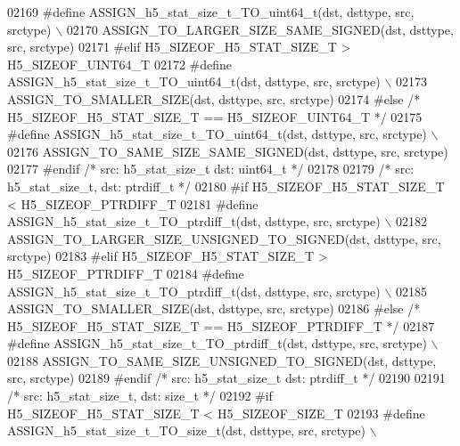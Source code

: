 \begin{DoxyCode}
02169 \textcolor{preprocessor}{    #define ASSIGN\_h5\_stat\_size\_t\_TO\_uint64\_t(dst, dsttype, src, srctype) \(\backslash\)}
02170 \textcolor{preprocessor}{        ASSIGN\_TO\_LARGER\_SIZE\_SAME\_SIGNED(dst, dsttype, src, srctype)}
02171 \textcolor{preprocessor}{#elif H5\_SIZEOF\_H5\_STAT\_SIZE\_T > H5\_SIZEOF\_UINT64\_T}
02172 \textcolor{preprocessor}{    #define ASSIGN\_h5\_stat\_size\_t\_TO\_uint64\_t(dst, dsttype, src, srctype) \(\backslash\)}
02173 \textcolor{preprocessor}{        ASSIGN\_TO\_SMALLER\_SIZE(dst, dsttype, src, srctype)}
02174 \textcolor{preprocessor}{#else }\textcolor{comment}{/* H5\_SIZEOF\_H5\_STAT\_SIZE\_T == H5\_SIZEOF\_UINT64\_T */}\textcolor{preprocessor}{}
02175 \textcolor{preprocessor}{    #define ASSIGN\_h5\_stat\_size\_t\_TO\_uint64\_t(dst, dsttype, src, srctype) \(\backslash\)}
02176 \textcolor{preprocessor}{        ASSIGN\_TO\_SAME\_SIZE\_SAME\_SIGNED(dst, dsttype, src, srctype)}
02177 \textcolor{preprocessor}{#endif }\textcolor{comment}{/* src: h5\_stat\_size\_t dst: uint64\_t */}\textcolor{preprocessor}{}
02178 
02179 \textcolor{comment}{/* src: h5\_stat\_size\_t, dst: ptrdiff\_t */}
02180 \textcolor{preprocessor}{#if H5\_SIZEOF\_H5\_STAT\_SIZE\_T < H5\_SIZEOF\_PTRDIFF\_T}
02181 \textcolor{preprocessor}{    #define ASSIGN\_h5\_stat\_size\_t\_TO\_ptrdiff\_t(dst, dsttype, src, srctype) \(\backslash\)}
02182 \textcolor{preprocessor}{        ASSIGN\_TO\_LARGER\_SIZE\_UNSIGNED\_TO\_SIGNED(dst, dsttype, src, srctype)}
02183 \textcolor{preprocessor}{#elif H5\_SIZEOF\_H5\_STAT\_SIZE\_T > H5\_SIZEOF\_PTRDIFF\_T}
02184 \textcolor{preprocessor}{    #define ASSIGN\_h5\_stat\_size\_t\_TO\_ptrdiff\_t(dst, dsttype, src, srctype) \(\backslash\)}
02185 \textcolor{preprocessor}{        ASSIGN\_TO\_SMALLER\_SIZE(dst, dsttype, src, srctype)}
02186 \textcolor{preprocessor}{#else }\textcolor{comment}{/* H5\_SIZEOF\_H5\_STAT\_SIZE\_T == H5\_SIZEOF\_PTRDIFF\_T */}\textcolor{preprocessor}{}
02187 \textcolor{preprocessor}{    #define ASSIGN\_h5\_stat\_size\_t\_TO\_ptrdiff\_t(dst, dsttype, src, srctype) \(\backslash\)}
02188 \textcolor{preprocessor}{        ASSIGN\_TO\_SAME\_SIZE\_UNSIGNED\_TO\_SIGNED(dst, dsttype, src, srctype)}
02189 \textcolor{preprocessor}{#endif }\textcolor{comment}{/* src: h5\_stat\_size\_t dst: ptrdiff\_t */}\textcolor{preprocessor}{}
02190 
02191 \textcolor{comment}{/* src: h5\_stat\_size\_t, dst: size\_t */}
02192 \textcolor{preprocessor}{#if H5\_SIZEOF\_H5\_STAT\_SIZE\_T < H5\_SIZEOF\_SIZE\_T}
02193 \textcolor{preprocessor}{    #define ASSIGN\_h5\_stat\_size\_t\_TO\_size\_t(dst, dsttype, src, srctype) \(\backslash\)}

\end{DoxyCode}
